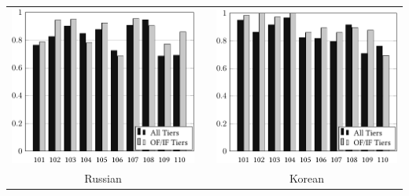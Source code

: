 \documentclass[a4paper]{article}
\begin{document}
\begin{tabular}[t]{ccc}
\includegraphics{kappa-rus.pdf} & \xspace & \includegraphics{kappa-kor.pdf} \\
Russian & & Korean \\
\end{tabular}
\end{document}
